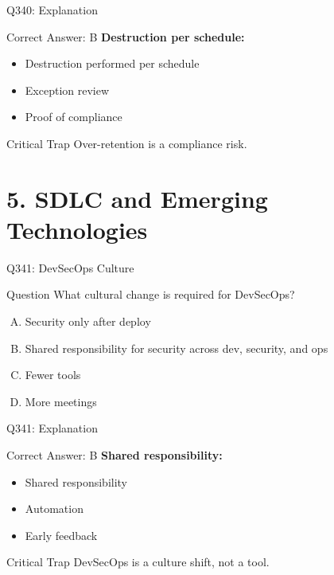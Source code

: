 \documentclass{beamer}
\begin{document}
	\begin{frame}{Q340: Explanation}
		\begin{block}{Correct Answer: B}
			\textbf{Destruction per schedule:}
			\begin{itemize}
				\item Destruction performed per schedule
				\item Exception review
				\item Proof of compliance
			\end{itemize}
		\end{block}
		\begin{alertblock}{Critical Trap}
			Over-retention is a compliance risk.
		\end{alertblock}
	\end{frame}
	
	\section{5. SDLC and Emerging Technologies}
	
	\begin{frame}{Q341: DevSecOps Culture}
		\begin{block}{Question}
			What cultural change is required for DevSecOps?
		\end{block}
		\begin{enumerate}[(A)]
			\item Security only after deploy
			\item Shared responsibility for security across dev, security, and ops
			\item Fewer tools
			\item More meetings
		\end{enumerate}
	\end{frame}
	
	\begin{frame}{Q341: Explanation}
		\begin{block}{Correct Answer: B}
			\textbf{Shared responsibility:}
			\begin{itemize}
				\item Shared responsibility
				\item Automation
				\item Early feedback
			\end{itemize}
		\end{block}
		\begin{alertblock}{Critical Trap}
			DevSecOps is a culture shift, not a tool.
		\end{alertblock}
	\end{frame}
	
\end{document}

